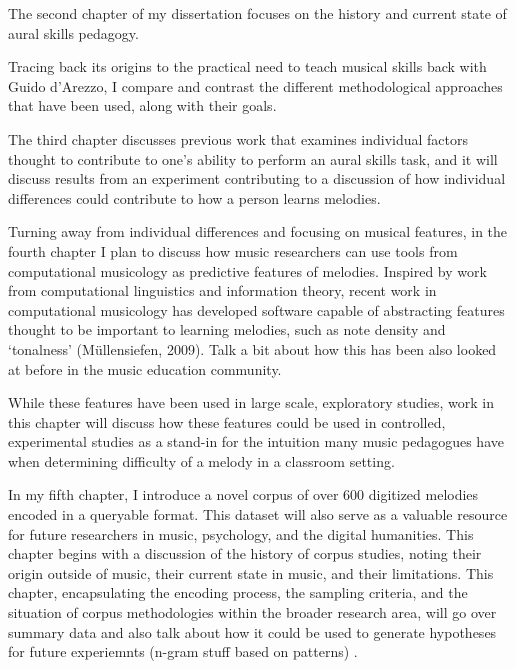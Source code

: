 \documentclass[]{book}
\theoremstyle{definition}
\theoremstyle{definition}
\theoremstyle{definition}
\theoremstyle{remark}
\begin{document}
The second chapter of my dissertation focuses on the history and current
state of aural skills pedagogy.

Tracing back its origins to the practical need to teach musical skills
back with Guido d'Arezzo, I compare and contrast the different
methodological approaches that have been used, along with their goals.

The third chapter discusses previous work that examines individual
factors thought to contribute to one's ability to perform an aural
skills task, and it will discuss results from an experiment contributing
to a discussion of how individual differences could contribute to how a
person learns melodies.

Turning away from individual differences and focusing on musical
features, in the fourth chapter I plan to discuss how music researchers
can use tools from computational musicology as predictive features of
melodies. Inspired by work from computational linguistics and
information theory, recent work in computational musicology has
developed software capable of abstracting features thought to be
important to learning melodies, such as note density and `tonalness'
(Müllensiefen, 2009). Talk a bit about how this has been also looked at
before in the music education community.

While these features have been used in large scale, exploratory studies,
work in this chapter will discuss how these features could be used in
controlled, experimental studies as a stand-in for the intuition many
music pedagogues have when determining difficulty of a melody in a
classroom setting.

In my fifth chapter, I introduce a novel corpus of over 600 digitized
melodies encoded in a queryable format. This dataset will also serve as
a valuable resource for future researchers in music, psychology, and the
digital humanities. This chapter begins with a discussion of the history
of corpus studies, noting their origin outside of music, their current
state in music, and their limitations. This chapter, encapsulating the
encoding process, the sampling criteria, and the situation of corpus
methodologies within the broader research area, will go over summary
data and also talk about how it could be used to generate hypotheses for
future experiemnts (n-gram stuff based on patterns) .
\end{document}
